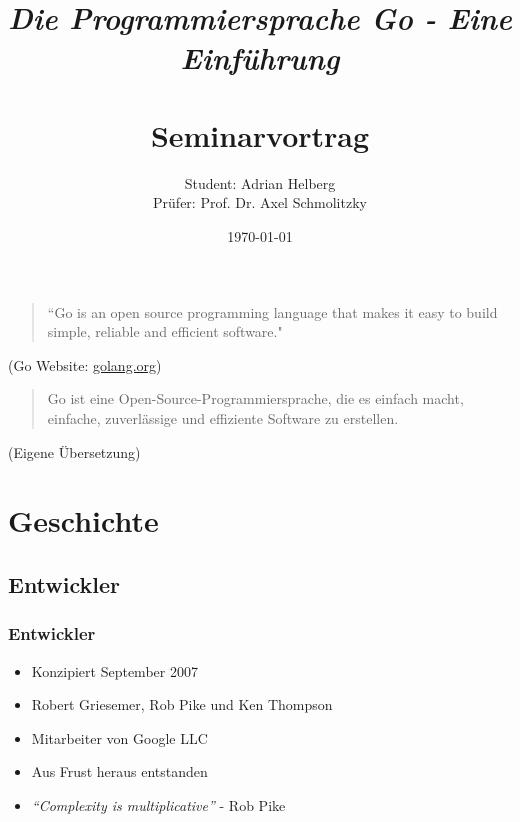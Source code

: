 \documentclass{beamer}
\title{
	\Large{\textit{\\Die Programmiersprache Go - Eine Einf\"uhrung}} \\
	\Large{\textbf{\\Seminarvortrag}}
}
\author{Student: Adrian Helberg \\Prüfer: Prof. Dr. Axel Schmolitzky}
\date{\today}
\begin{document}

\maketitle

\frame{\tableofcontents}

\begin{frame}

\begin{quote}
``Go is an open source programming language that makes it easy to build simple, reliable and efficient software." 
\end{quote}

\begin{flushright}
\scriptsize (Go Website: \href{golang.org}{golang.org})
\end{flushright}

\begin{quote}
Go ist eine Open-Source-Programmiersprache, die es einfach macht, einfache, zuverlässige und effiziente Software zu erstellen.
\end{quote}

\begin{flushright}
\scriptsize (Eigene \"Ubersetzung)
\end{flushright}

\end{frame}

\section{Geschichte}
\subsection{Entwickler}
\begin{frame}
\frametitle{Entwickler}

\begin{itemize}
\setlength{\itemsep}{24pt}
\item Konzipiert September 2007
\item Robert Griesemer, Rob Pike und Ken Thompson
\item Mitarbeiter von Google LLC \textregistered
\item Aus Frust heraus entstanden
\item \textit{``Complexity is multiplicative''} - Rob Pike
\end{itemize}

\end{frame}
\end{document}
